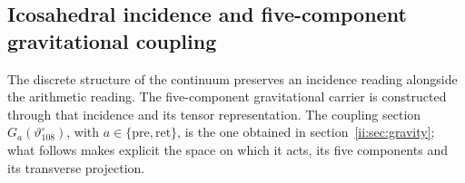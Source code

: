 \subsection{Icosahedral incidence and five-component gravitational coupling}
\label{ii:sec:ii-pentadica}

The discrete structure of the continuum preserves an incidence reading
alongside the arithmetic reading. The five-component gravitational carrier is
constructed through that incidence and its tensor representation. The coupling
section \(G_a(\vartheta^\circ_{108})\), with
\(a\in\{\mathrm{pre},\mathrm{ret}\}\), is the one obtained in
section~\ref{ii:sec:gravity}; what follows makes explicit the space on
which it acts, its five components and its transverse projection.

